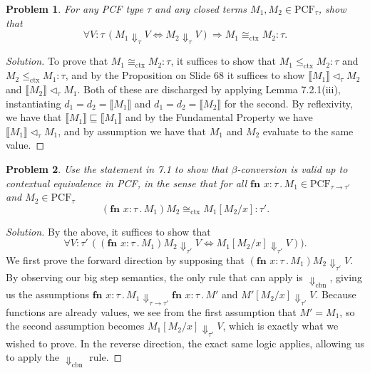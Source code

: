 \documentclass{article}
\newtheorem{problem}{Problem}[section]}
\newcommand{\f}{\rightarrow}
\newcommand{\ev}[1]{\Downarrow_\text{#1}}
\newcommand{\den}[1]{\llbracket #1 \rrbracket}
\begin{document}
\begin{problem}
    For any PCF type $\tau$ and any closed terms $M_1,M_2\in\text{PCF}_\tau$,
    show that
    \[
        \forall V:\tau\, (M_1\Downarrow_\tau V \Leftrightarrow M_2\Downarrow_\tau V)
        \Rightarrow M_1 \cong_\text{ctx} M_2 : \tau.
    \]
\end{problem}
\begin{proof}[Solution]
    To prove that $M_1\cong_\text{ctx}M_2 : \tau$, it suffices to show that
    $M_1\leq_\text{ctx}M_2:\tau$ and $M_2\leq_\text{ctx}M_1:\tau$, and by the
    Proposition on Slide 68 it suffices to show $\den{M_1} \lhd_\tau M_2$ and
    $\den{M_2}\lhd_\tau M_1$. Both of these are discharged by applying Lemma
    7.2.1(iii), instantiating $d_1=d_2=\den{M_1}$ and $d_1=d_2=\den{M_2}$ for
      the second. By reflexivity, we have that $\den{M_1}\sqsubseteq\den{M_1}$
      and by the Fundamental Property we have $\den{M_1}\lhd_\tau M_1$, and by
      assumption we have that $M_1$ and $M_2$ evaluate to the same value.
\end{proof}

\begin{problem}
    Use the statement in 7.1 to show that $\beta$-conversion is valid up to
    contextual equivalence in PCF, in the sense that for all $\textbf{fn
    }x:\tau\,.\,M_1\in\text{PCF}_{\tau\f\tau'}$ and $M_2\in\text{PCF}_\tau$
    \[
        (\textbf{fn }x:\tau\,.\,M_1)M_2\cong_\text{ctx} M_1[M_2/x] : \tau'.
    \]
\end{problem}
\begin{proof}[Solution]
    By the above, it suffices to show that
    \[
        \forall V:\tau'\,((\textbf{fn }x:\tau\,.\,M_1)M_2 \Downarrow_{\tau'} V
        \Leftrightarrow M_1[M_2/x] \Downarrow_{\tau'} V)).
    \]
    We first prove the forward direction by supposing that $(\textbf{fn
    }x:\tau\,.\,M_1)M_2 \Downarrow_{\tau'} V$. By observing our big step
    semantics, the only rule that can apply is $\Downarrow_\text{cbn}$, giving
    us the assumptions $\textbf{fn }x:\tau\,.\,M_1 \Downarrow_{\tau\f\tau'}
    \textbf{fn }x:\tau\,.\,M'$ and $M'[M_2/x] \Downarrow_{\tau'} V$. Because
    functions are already values, we see from the first assumption that
    $M'=M_1$, so the second assumption becomes $M_1[M_2/x]\Downarrow_{\tau'} V$,
    which is exactly what we wished to prove. In the reverse direction, the
    exact same logic applies, allowing us to apply the $\ev{cbn}$ rule.
\end{proof}
\end{document}
